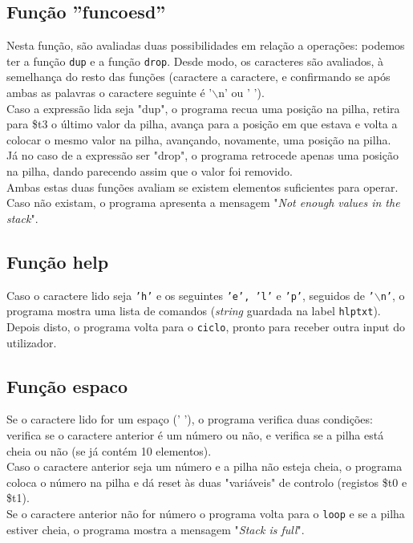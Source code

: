 \documentclass[12pt, a4paper]{article}
\begin{document}
        \subsection{Função ''funcoesd''}
        Nesta função, são avaliadas duas possibilidades em relação a operações: podemos ter a função \texttt{dup} e a função \texttt{drop}. Desde modo, os caracteres são avaliados, à semelhança do resto das funções (caractere a caractere, e confirmando se após ambas as palavras o caractere seguinte é '$\backslash$n' ou ' ').\\
        Caso a expressão lida seja "dup", o programa recua uma posição na pilha, retira para \$t3 o último valor da pilha, avança para a posição em que estava e volta a colocar o mesmo valor na pilha, avançando, novamente, uma posição na pilha.\\
        Já no caso de a expressão ser "drop", o programa retrocede apenas uma posição na pilha, dando parecendo assim que o valor foi removido.\\
        Ambas estas duas funções avaliam se existem elementos suficientes para operar. Caso não existam, o programa apresenta a mensagem "\textit{Not enough values in the stack}".
        
        \subsection{Função help}
        Caso o caractere lido seja \texttt{'h'} e os seguintes \texttt{'e', 'l'} e \texttt{'p'}, seguidos de \texttt{'$\backslash$n'}, o programa mostra uma lista de comandos (\textit{string} guardada na label \texttt{hlptxt}). Depois disto, o programa volta para o \texttt{ciclo}, pronto para receber outra input do utilizador.
        
        \subsection{Função espaco}
        Se o caractere lido for um espaço (' '), o programa verifica duas condições: verifica se o caractere anterior é um número ou não, e verifica se a pilha está cheia ou não (se já contém 10 elementos).\\
        Caso o caractere anterior seja um número e a pilha não esteja cheia, o programa coloca o número na pilha e dá reset às duas "variáveis" de controlo (registos \$t0 e \$t1).\\
        Se o caractere anterior não for número o programa volta para o \texttt{loop} e se a pilha estiver cheia, o programa mostra a mensagem "\textit{Stack is full}".
        
\end{document}
